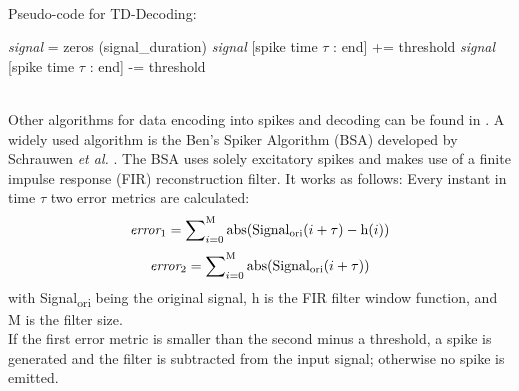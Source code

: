 \documentclass[journal,article,submit,moreauthors,pdftex,10pt,a4paper]{Definitions/mdpi}
\begin{document}
\ \\
Pseudo-code for TD-Decoding:
\begin{algorithmic}[1]
\STATE \textit{signal} = zeros (signal\_duration)
\vspace{0.2cm}
\vspace{0.1cm}
\vspace{0.2cm}
\STATE \textit{signal} [spike time $\tau$ : end] += threshold
\vspace{0.2cm}
\ELSE
\vspace{0.2cm}
\STATE \textit{signal} [spike time $\tau$ : end] -= threshold
\vspace{0.2cm}
\ENDIF
\vspace{0.2cm}
\ENDFOR
\end{algorithmic}
\\
\vspace{0.2cm}
Other algorithms for data encoding into spikes and decoding can be found in \cite{35}. A widely used algorithm is the Ben's Spiker Algorithm (BSA) developed by Schrauwen \textit{et al.} \cite{37}.
The BSA uses solely excitatory spikes and makes use of a finite impulse response (FIR) reconstruction filter. It works as follows: Every instant in time $\tau$ two error metrics are calculated: 
\begin{equation}
    \mathrm{\textit{error}}_1 = \sum\nolimits_{i=0}^\mathrm{M} \mathrm{abs}(\mathrm{Signal}\textsubscript{ori}(i+\tau)-\mathrm{h}(i))
    \label{EQ:BSA_error_1}
    \end{equation}
\begin{equation}
    \mathrm{\textit{error}}_2 = \sum\nolimits_{i=0}^\mathrm{M} \mathrm{abs}(\mathrm{Signal}\textsubscript{ori}(i+\tau))
    \label{EQ:BSA_error_2}
    \end{equation}
with Signal\textsubscript{ori} being the original signal, h is the FIR filter window function, and M is the filter size.\\
If the first error metric is smaller than the second minus a threshold, a spike is generated and the filter is subtracted from the input signal; otherwise no spike is emitted. 
\end{document}
